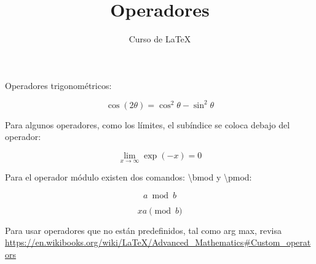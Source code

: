 \documentclass[12pt,letterpaper]{article}
\author{Curso de \LaTeX}
\title{Operadores}
\begin{document}
\maketitle

Operadores trigonométricos:

\[ \cos (2\theta) = \cos^2 \theta - \sin^2 \theta \]

Para algunos operadores, como los límites, el subíndice se coloca debajo del operador:

\[ \lim_{x \to \infty} \exp(-x) = 0 \]

Para el operador módulo existen dos comandos: \textbackslash bmod y \textbackslash pmod:

\[ a \bmod b \]

\[ x a \pmod b \]

Para usar operadores que no están predefinidos, tal como arg max, revisa \url{https://en.wikibooks.org/wiki/LaTeX/Advanced_Mathematics#Custom_operators}
\end{document}
